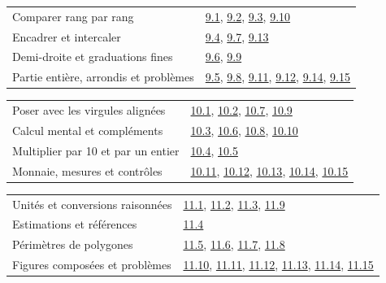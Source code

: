 \begin{tabularx}{\linewidth}{@{}Yl@{}}\toprule
Comparer rang par rang & \hyperref[exo-9-1]{9.1}, \hyperref[exo-9-2]{9.2}, \hyperref[exo-9-3]{9.3}, \hyperref[exo-9-10]{9.10}\\[2mm]
Encadrer et intercaler & \hyperref[exo-9-4]{9.4}, \hyperref[exo-9-7]{9.7}, \hyperref[exo-9-13]{9.13}\\[2mm]
Demi-droite et graduations fines & \hyperref[exo-9-6]{9.6}, \hyperref[exo-9-9]{9.9}\\[2mm]
Partie entière, arrondis et problèmes & \hyperref[exo-9-5]{9.5}, \hyperref[exo-9-8]{9.8}, \hyperref[exo-9-11]{9.11}, \hyperref[exo-9-12]{9.12}, \hyperref[exo-9-14]{9.14}, \hyperref[exo-9-15]{9.15}\\[2mm]
\bottomrule\end{tabularx}\par\vspace{4mm}
\clearpage
{}\fontsize{10}{13}\selectfont
{}\begin{tabularx}{\linewidth}{@{}Yl@{}}\toprule
Poser avec les virgules alignées & \hyperref[exo-10-1]{10.1}, \hyperref[exo-10-2]{10.2}, \hyperref[exo-10-7]{10.7}, \hyperref[exo-10-9]{10.9}\\[2mm]
Calcul mental et compléments & \hyperref[exo-10-3]{10.3}, \hyperref[exo-10-6]{10.6}, \hyperref[exo-10-8]{10.8}, \hyperref[exo-10-10]{10.10}\\[2mm]
Multiplier par 10 et par un entier & \hyperref[exo-10-4]{10.4}, \hyperref[exo-10-5]{10.5}\\[2mm]
Monnaie, mesures et contrôles & \hyperref[exo-10-11]{10.11}, \hyperref[exo-10-12]{10.12}, \hyperref[exo-10-13]{10.13}, \hyperref[exo-10-14]{10.14}, \hyperref[exo-10-15]{10.15}\\[2mm]
\bottomrule\end{tabularx}\par\vspace{4mm}
\begin{tabularx}{\linewidth}{@{}Yl@{}}\toprule
Unités et conversions raisonnées & \hyperref[exo-11-1]{11.1}, \hyperref[exo-11-2]{11.2}, \hyperref[exo-11-3]{11.3}, \hyperref[exo-11-9]{11.9}\\[2mm]
Estimations et références & \hyperref[exo-11-4]{11.4}\\[2mm]
Périmètres de polygones & \hyperref[exo-11-5]{11.5}, \hyperref[exo-11-6]{11.6}, \hyperref[exo-11-7]{11.7}, \hyperref[exo-11-8]{11.8}\\[2mm]
Figures composées et problèmes & \hyperref[exo-11-10]{11.10}, \hyperref[exo-11-11]{11.11}, \hyperref[exo-11-12]{11.12}, \hyperref[exo-11-13]{11.13}, \hyperref[exo-11-14]{11.14}, \hyperref[exo-11-15]{11.15}\\[2mm]
\bottomrule\end{tabularx}\par\vspace{4mm}
